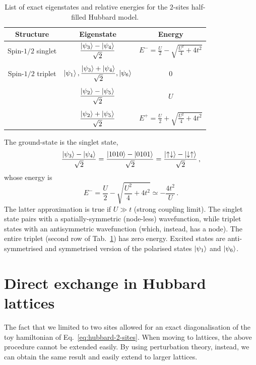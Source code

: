 \begin{table}
	\centering
	\begin{tabular}{c c c}
		\textbf{Structure} & \textbf{Eigenstate} & \textbf{Energy} \\
		\midrule
		Spin-$1/2$ singlet & $\displaystyle \frac{\ket{\psi_3} - \ket{\psi_4}}{\sqrt{2}}$ & $\displaystyle E^- = \frac{U}{2} - \sqrt{\frac{U^2}{4} + 4t^2}$ \\
		&&\\ %
		Spin-$1/2$ triplet & $\ket{\psi_1}, \displaystyle \frac{\ket{\psi_3} + \ket{\psi_4}}{\sqrt{2}}, \ket{\psi_6}$ & 0 \\
		&&\\ %
		&$\displaystyle \frac{\ket{\psi_2}-\ket{\psi_5}}{\sqrt{2}}$ & $U$\\
		&&\\ %
		&$\displaystyle \frac{\ket{\psi_2}+\ket{\psi_5}}{\sqrt{2}}$ & $\displaystyle E^+ = \frac{U}{2} + \sqrt{\frac{U^2}{4} + 4t^2}$ \\
		\midrule
	\end{tabular}
	\caption{List of exact eigenstates and relative energies for the $2$-sites half-filled Hubbard model.}
	\label{apptab:two-sites-hubbard-model-eigenstates}
\end{table}

The ground-state is the singlet state,
\[
	\frac{\ket{\psi_3} - \ket{\psi_4}}{\sqrt{2}} = \frac{\ket{1010} - \ket{0101}}{\sqrt{2}} = \frac{\ket{\uparrow\downarrow} - \ket{\downarrow\uparrow}}{\sqrt{2}} \, ,
\]
whose energy is
\[
	E^- = \frac{U}{2} - \sqrt{\frac{U^2}{4} + 4t^2} \simeq - \frac{4t^2}{U} \, .
\]
The latter approximation is true if $U \gg t$ (strong coupling limit). The singlet state pairs with a spatially-symmetric (node-less) wavefunction, while triplet states with an antisymmetric wavefunction (which, instead, has a node). The entire triplet (second row of Tab.~\ref{apptab:two-sites-hubbard-model-eigenstates}) has zero energy. Excited states are anti-symmetrised and symmetrised version of the polarised states $\ket{\psi_1}$ and $\ket{\psi_6}$.

\section{Direct exchange in Hubbard lattices}\label{appsec:direct-exchange}

The fact that we limited to two sites allowed for an exact diagonalisation of the toy hamiltonian of Eq.~\eqref{eq:hubbard-2-sites}. When moving to lattices, the above procedure cannot be extended easily. By using perturbation theory, instead, we can obtain the same result and easily extend to larger lattices.

